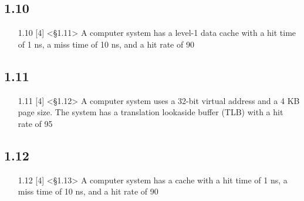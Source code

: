 \documentclass{article}
\begin{document}

\subsection*{1.10}
\begin{enumerate}
    \item[1.10] [4] <§1.11> A computer system has a level-1 data cache with a hit time of 1 ns, a miss time of 10 ns, and a hit rate of 90%
\end{enumerate}

\subsection*{1.11}
\begin{enumerate}
    \item[1.11] [4] <§1.12> A computer system uses a 32-bit virtual address and a 4 KB page size. The system has a translation lookaside buffer (TLB) with a hit rate of 95%
\end{enumerate}

\subsection*{1.12}
\begin{enumerate}
    \item[1.12] [4] <§1.13> A computer system has a cache with a hit time of 1 ns, a miss time of 10 ns, and a hit rate of 90%
\end{enumerate}
\end{document}
